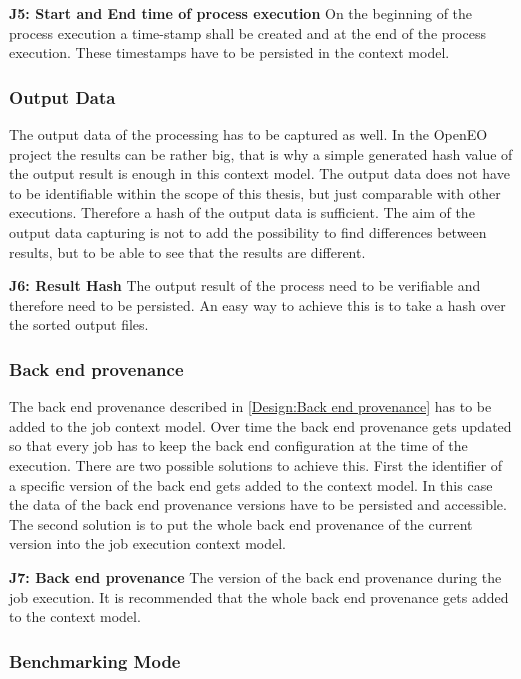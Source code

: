 \documentclass[draft,final]{vutinfth} %
\begin{document}
\textbf{J5: Start and End time of process execution}
On the beginning of the process execution a time-stamp shall  be created and at the end of the process execution. These timestamps have to be persisted in the context model.

\subsubsection{Output Data}\label{Job:Output Data}
The output data of the processing has to be captured as well. In the OpenEO project the results can be rather big, that is why a simple generated hash value of the output result is enough in this context model. The output data does not have to be identifiable within the scope of this thesis, but just comparable with other executions. Therefore a hash of the output data is sufficient. The aim of the output data capturing is not to add the possibility to find differences between results, but to be able to see that the results are different. 

\textbf{J6: Result Hash}
The output result of the process need to be verifiable and therefore need to be persisted. An easy way to achieve this is to take a hash over the sorted output files. 

\subsubsection{Back end provenance}\label{Job:Back end provenance}
The back end provenance described in \ref{Design:Back end provenance} has to be added to the job context model. Over time the back end provenance gets updated so that every job has to keep the back end configuration at the time of the execution. There are two possible solutions to achieve this. First the  identifier of a specific version of the back end gets added to the context model. In this case the data of the back end provenance versions have to be persisted and accessible. The second solution is to put the whole back end provenance of the current version into the job execution context model.

\textbf{J7: Back end provenance} 
The version of the back end provenance during the job execution. It is recommended that  the whole back end provenance gets added to the context model.

\subsubsection{Benchmarking Mode}\label{Job:Benchmarking}
\end{document}
